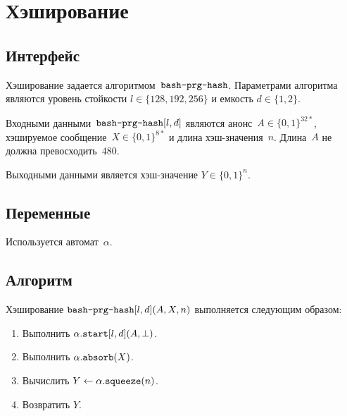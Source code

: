 \section{Хэширование}\label{PRG.Hash}

\subsection{Интерфейс}\label{PRG.Hash.IFace}

Хэширование задается алгоритмом~$\texttt{bash-prg-hash}$.
Параметрами алгоритма являются уровень стойкости $l\in\{128,192,256\}$
и емкость $d\in\{1,2\}$. 

Входными данными~$\texttt{bash-prg-hash}[l, d]$ являются 
анонс~$A\in\{0,1\}^{32*}$, хэшируемое сообщение~$X\in\{0,1\}^{8*}$ 
и длина хэш-значения~$n$. Длина~$A$ не должна превосходить~$480$.

Выходными данными является хэш-значение $Y\in\{0,1\}^n$.

\subsection{Переменные}\label{PRG.Hash.Vars}

Используется автомат~$\alpha$.

\subsection{Алгоритм}\label{PRG.Hash.Alg}

Хэширование $\texttt{bash-prg-hash}[l,d](A,X,n)$ выполняется следующим образом:
\begin{enumerate}
\item
Выполнить $\alpha.\texttt{start}[l,d](A,\perp)$.
\item
Выполнить $\alpha.\texttt{absorb}(X)$.
\item
Вычислить $Y\leftarrow \alpha.\texttt{squeeze}(n)$.
\item
Возвратить $Y$.
\end{enumerate}
